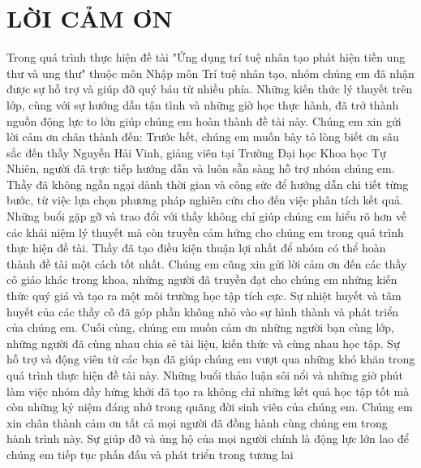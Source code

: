 \documentclass[a4paper]{article}
\begin{document}
\newpage

\vspace{1cm}

\begin{flushleft}

\end{flushleft}

\tableofcontents
\newpage
\section*{LỜI CẢM ƠN}
 Trong quá trình thực hiện đề tài "Ứng dụng trí tuệ nhân tạo phát hiện tiền ung thư và ung thư" thuộc môn Nhập môn Trí tuệ nhân tạo, nhóm chúng em đã nhận được sự hỗ trợ và giúp đỡ quý báu từ nhiều phía. Những kiến thức lý thuyết trên lớp, cùng với sự hướng dẫn tận tình và những giờ học thực hành, đã trở thành nguồn động lực to lớn giúp chúng em hoàn thành đề tài này. Chúng em xin gửi lời cảm ơn chân thành đến: Trước hết, chúng em muốn bày tỏ lòng biết ơn sâu sắc đến thầy Nguyễn Hải Vinh, giảng viên tại Trường Đại học Khoa học Tự Nhiên, người đã trực tiếp hướng dẫn và luôn sẵn sàng hỗ trợ nhóm chúng em. Thầy đã không ngần ngại dành thời gian và công sức để hướng dẫn chi tiết từng bước, từ việc lựa chọn phương pháp nghiên cứu cho đến việc phân tích kết quả. Những buổi gặp gỡ và trao đổi với thầy không chỉ giúp chúng em hiểu rõ hơn về các khái niệm lý thuyết mà còn truyền cảm hứng cho chúng em trong quá trình thực hiện đề tài. Thầy đã tạo điều kiện thuận lợi nhất để nhóm có thể hoàn thành đề tài một cách tốt nhất. Chúng em cũng xin gửi lời cảm ơn đến các thầy cô giáo khác trong khoa, những người đã truyền đạt cho chúng em những kiến thức quý giá và tạo ra một môi trường học tập tích cực. Sự nhiệt huyết và tâm huyết của các thầy cô đã góp phần không nhỏ vào sự hình thành và phát triển của chúng em. Cuối cùng, chúng em muốn cảm ơn những người bạn cùng lớp, những người đã cùng nhau chia sẻ tài liệu, kiến thức và cùng nhau học tập. Sự hỗ trợ và động viên từ các bạn đã giúp chúng em vượt qua những khó khăn trong quá trình thực hiện đề tài này. Những buổi thảo luận sôi nổi và những giờ phút làm việc nhóm đầy hứng khởi đã tạo ra không chỉ những kết quả học tập tốt mà còn những kỷ niệm đáng nhớ trong quãng đời sinh viên của chúng em. Chúng em xin chân thành cảm ơn tất cả mọi người đã đồng hành cùng chúng em trong hành trình này. Sự giúp đỡ và ủng hộ của mọi người chính là động lực lớn lao để chúng em tiếp tục phấn đấu và phát triển trong tương lai
\newpage

\newpage

\newpage

\newpage

\newpage

\newpage

\newpage

\end{document}
